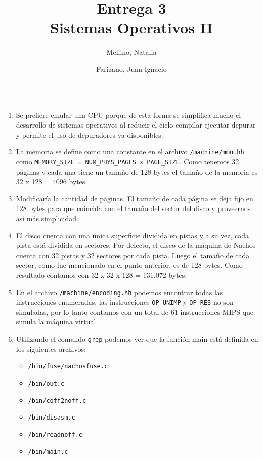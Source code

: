\documentclass[11pt]{article}
\title{
    Entrega 3 \\
    \large Sistemas Operativos II}
\author{Mellino, Natalia \and Farizano, Juan Ignacio}
\date{}
\begin{document}
\maketitle

\noindent\rule{\textwidth}{1pt}

\begin{enumerate}
    \item Se prefiere emular una CPU porque de esta forma se simplifica mucho
          el desarrollo de sistemas operativos al reducir el ciclo
          compilar-ejecutar-depurar y permite el uso de depuradores ya disponibles.
    \item La memoria se define como una constante en el archivo \texttt{/machine/mmu.hh} como 
          \texttt{MEMORY\_SIZE = NUM\_PHYS\_PAGES x PAGE\_SIZE}. Como tenemos 32 páginas
          y cada una tiene un tamaño de 128 bytes el tamaño de la memoria es 32 x 128 = 4096 bytes.
    \item  Modificaría la cantidad de páginas. El tamaño de cada página se deja fijo en 128 bytes para 
           que coincida con el tamaño del sector del disco y proveernos así más simplicidad.
    \item El disco cuenta con una única superficie dividida en pistas y a su vez, cada pista está dividida 
          en sectores. Por defecto, el disco de la máquina de Nachos cuenta con 32 pistas y 32 sectores por 
          cada pista. Luego el tamaño de cada sector, como fue mencionado en el punto anterior, es de 128 bytes. 
          Como resultado contamos con 32 x 32 x 128 = 131.072 bytes.
    \item En el archivo \texttt{/machine/encoding.hh} podemos encontrar todas las instrucciones enumeradas, las 
          instrucciones \texttt{OP\_UNIMP} y \texttt{OP\_RES} no son  simuladas, por lo tanto contamos con un total de 61 instrucciones 
          MIPS  que simula la máquina virtual.
    \item Utilizando el comando \texttt{grep} podemos ver que la función main está
          definida en los siguientes archivos:
    \begin{itemize}
        \item \texttt{/bin/fuse/nachosfuse.c}
        \item \texttt{/bin/out.c}
        \item \texttt{/bin/coff2noff.c}
        \item \texttt{/bin/disasm.c}
        \item \texttt{/bin/readnoff.c}
        \item \texttt{/bin/main.c}

\end{itemize}
\end{enumerate}
\end{document}

